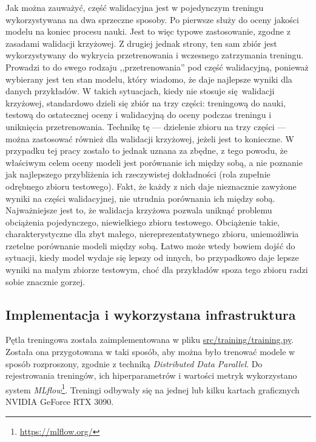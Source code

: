 Jak można zauważyć, część walidacyjna jest w pojedynczym treningu wykorzystywana na dwa sprzeczne sposoby. Po pierwsze służy do oceny jakości modelu na koniec procesu nauki. Jest to więc typowe zastosowanie, zgodne z zasadami walidacji krzyżowej. Z drugiej jednak strony, ten sam zbiór jest wykorzystywany do wykrycia przetrenowania i wczesnego zatrzymania treningu. Prowadzi to do swego rodzaju ,,przetrenowania'' pod część walidacyjną, ponieważ wybierany jest ten stan modelu, który wiadomo, że daje najlepsze wyniki dla danych przykładów. W takich sytuacjach, kiedy nie stosuje się walidacji krzyżowej, standardowo dzieli się zbiór na trzy części: treningową do nauki, testową do ostatecznej oceny i walidacyjną do oceny podczas treningu i uniknięcia przetrenowania. Technikę tę --- dzielenie zbioru na trzy części --- można zastosować również dla walidacji krzyżowej, jeżeli jest to konieczne. W przypadku tej pracy zostało to jednak uznana za zbędne, z tego powodu, że właściwym celem oceny modeli jest porównanie ich między sobą, a nie poznanie jak najlepszego przybliżenia ich rzeczywistej dokładności (rola zupełnie odrębnego zbioru testowego). Fakt, że każdy z nich daje nieznacznie zawyżone wyniki na części walidacyjnej, nie utrudnia porównania ich między sobą. Najważniejsze jest to, że walidacja krzyżowa pozwala uniknąć problemu obciążenia pojedynczego, niewielkiego zbioru testowego. Obciążenie takie, charakterystyczne dla zbyt małego, niereprezentatywnego zbioru, uniemożliwia rzetelne porównanie modeli między sobą. Łatwo może wtedy bowiem dojść do sytuacji, kiedy model wydaje się lepszy od innych, bo przypadkowo daje lepsze wyniki na małym zbiorze testowym, choć dla przykładów spoza tego zbioru radzi sobie znacznie gorzej.

\subsection{Implementacja i wykorzystana infrastruktura}

Pętla treningowa została zaimplementowana w pliku \url{src/training/training.py}. Została ona przygotowana w taki sposób, aby można było trenować modele w sposób rozproszony, zgodnie z techniką \emph{Distributed Data Parallel}. Do rejestrowania treningów, ich hiperparametrów i wartości metryk wykorzystano system \emph{MLflow}\footnote{\url{https://mlflow.org/}}. Treningi odbywały się na jednej lub kilku kartach graficznych NVIDIA GeForce RTX 3090.

